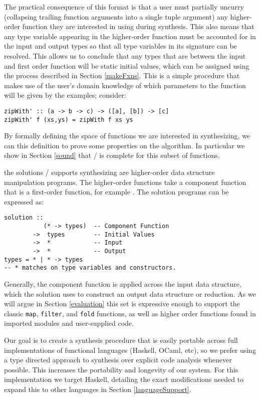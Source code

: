 The practical consequence of this format is that a user must partially uncurry (collapsing trailing function arguments into a single tuple argument) any higher-order function they are interested in using during synthesis.
This also means that any type variable appearing in the higher-order function must be accounted for in the input and output types so that all type variables in its signature can be resolved.
This allows us to conclude that any types that are between the input and first order function will be static initial values, which can be assigned using the process described in Section \ref{makeFxns}.
This is a simple procedure that makes use of the user's domain knowledge of which parameters to the function will be given by the examples; consider:

\begin{lstlisting}
zipWith' :: (a -> b -> c) -> ([a], [b]) -> [c]
zipWith' f (xs,ys) = zipWith f xs ys
\end{lstlisting}

By formally defining the space of functions we are interested in synthesizing, we can this definition to prove some properties on the algorithm.
In particular we show in Section \ref{sound} that \ourTool/ is complete for this subset of functions.

the solutions \ourTool/ supports synthesizing are higher-order data structure manipulation programs.
The higher-order functions take a component function that is a first-order function, for example \codeinline{(+)}.
The solution programs can be expressed as:

\begin{lstlisting}
solution ::
           (* -> types)  -- Component Function
        ->  types        -- Initial Values
        ->  *            -- Input
        ->  *            -- Output
types = * | * -> types
-- * matches on type variables and constructors.
\end{lstlisting}

Generally, the component function is applied across the \textsf{input} data structure, which the \textsf{solution} uses to construct an \textsf{output} data structure or reduction. As we will argue in Section \ref{evaluation} this set is expressive enough to support the classic \texttt{map}, \texttt{filter}, and \texttt{fold} functions, as well as higher order functions found in imported modules and user-supplied code.

Our goal is to create a synthesis procedure that is easily portable across full implementations of functional languages (Haskell, OCaml, etc), so we prefer using a type directed approach to synthesis over explicit code analysis whenever possible. This increases the portability and longevity of our system. For this implementation we target Haskell, detailing the exact modifications needed to expand this to other languages in Section \ref{languageSupport}.

